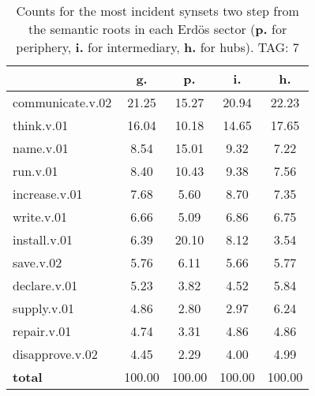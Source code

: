 \begin{table}[h!]
\begin{center}
\begin{tabular}{| l || c | c | c | c |}\hline
 & {\bf g.} & {\bf p.} & {\bf i.} & {\bf h.} \\\hline\hline
communicate.v.02 & 21.25  & 15.27  & 20.94  & 22.23 \\\hline
think.v.01 & 16.04  & 10.18  & 14.65  & 17.65 \\\hline
name.v.01 & 8.54  & 15.01  & 9.32  & 7.22 \\\hline
run.v.01 & 8.40  & 10.43  & 9.38  & 7.56 \\\hline
increase.v.01 & 7.68  & 5.60  & 8.70  & 7.35 \\\hline
write.v.01 & 6.66  & 5.09  & 6.86  & 6.75 \\\hline
install.v.01 & 6.39  & 20.10  & 8.12  & 3.54 \\\hline
save.v.02 & 5.76  & 6.11  & 5.66  & 5.77 \\\hline
declare.v.01 & 5.23  & 3.82  & 4.52  & 5.84 \\\hline
supply.v.01 & 4.86  & 2.80  & 2.97  & 6.24 \\\hline
repair.v.01 & 4.74  & 3.31  & 4.86  & 4.86 \\\hline
disapprove.v.02 & 4.45  & 2.29  & 4.00  & 4.99 \\\hline\hline
{{\bf total}} & 100.00  & 100.00  & 100.00  & 100.00 \\\hline
\end{tabular}
\caption{Counts for the most incident synsets two step from the semantic roots in each Erd\"os sector ({\bf p.} for periphery, {\bf i.} for intermediary, {\bf h.} for hubs). TAG: 7}
\end{center}
\end{table}